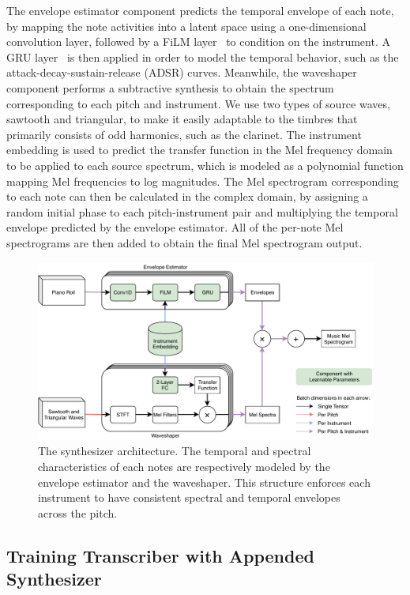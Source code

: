 The envelope estimator component predicts the temporal envelope of each note, by mapping the note activities into a latent space using a one-dimensional convolution layer, followed by a FiLM layer~\cite{perez2018film} to condition on the instrument.
A GRU layer~\cite{cho2014seq2seq} is then applied in order to model the temporal behavior, such as the attack-decay-sustain-release (ADSR) curves.
Meanwhile, the waveshaper component performs a subtractive synthesis to obtain the spectrum corresponding to each pitch and instrument.
We use two types of source waves, sawtooth and triangular, to make it easily adaptable to the timbres that primarily consists of odd harmonics, such as the clarinet.
The instrument embedding is used to predict the transfer function in the Mel frequency domain to be applied to each source spectrum, which is modeled as a polynomial function mapping Mel frequencies to log magnitudes.
The Mel spectrogram corresponding to each note can then be calculated in the complex domain, by assigning a random initial phase to each pitch-instrument pair and multiplying the temporal envelope predicted by the envelope estimator.
All of the per-note Mel spectrograms are then added to obtain the final Mel spectrogram output.



\begin{figure}
	\centering
	\includegraphics[width=\textwidth]{synthesizer-architecture.pdf}
	\caption{The synthesizer architecture. The temporal and spectral characteristics of each notes are respectively modeled by the envelope estimator and the waveshaper. This structure enforces each instrument to have consistent spectral and temporal envelopes across the pitch.}\label{fig:synthesizer-architecture}
\end{figure}


\subsection{Training Transcriber with Appended Synthesizer}

